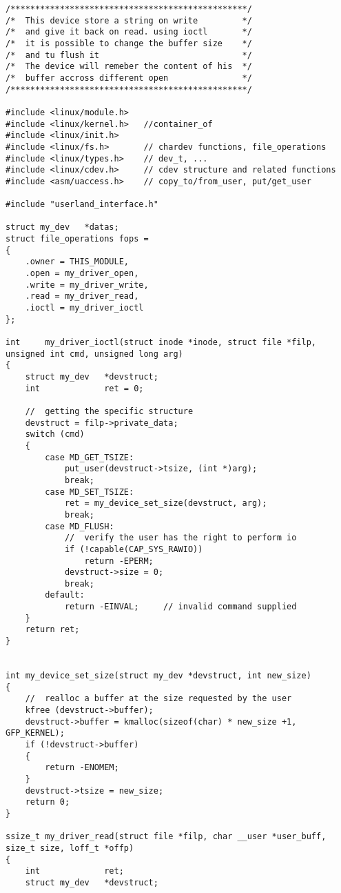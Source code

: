 \documentclass[11pt]{report}
\begin{document}
    \begin{lstlisting}
/************************************************/
/*  This device store a string on write         */
/*  and give it back on read. using ioctl       */
/*  it is possible to change the buffer size    */
/*  and tu flush it                             */
/*  The device will remeber the content of his  */
/*  buffer accross different open               */
/************************************************/

#include <linux/module.h>
#include <linux/kernel.h>   //container_of
#include <linux/init.h>
#include <linux/fs.h>       // chardev functions, file_operations
#include <linux/types.h>    // dev_t, ...
#include <linux/cdev.h>     // cdev structure and related functions
#include <asm/uaccess.h>    // copy_to/from_user, put/get_user

#include "userland_interface.h"

struct my_dev   *datas;
struct file_operations fops = 
{
    .owner = THIS_MODULE,
    .open = my_driver_open,
    .write = my_driver_write,
    .read = my_driver_read,
    .ioctl = my_driver_ioctl
};

int     my_driver_ioctl(struct inode *inode, struct file *filp, unsigned int cmd, unsigned long arg)
{
    struct my_dev   *devstruct;
    int             ret = 0;
    
    //  getting the specific structure
    devstruct = filp->private_data;
    switch (cmd)
    {
        case MD_GET_TSIZE:
            put_user(devstruct->tsize, (int *)arg);
            break;
        case MD_SET_TSIZE:
            ret = my_device_set_size(devstruct, arg);
            break;
        case MD_FLUSH:
            //  verify the user has the right to perform io
            if (!capable(CAP_SYS_RAWIO))
                return -EPERM;
            devstruct->size = 0;
            break;
        default:
            return -EINVAL;     // invalid command supplied
    }
    return ret;
}


int my_device_set_size(struct my_dev *devstruct, int new_size)
{
    //  realloc a buffer at the size requested by the user
    kfree (devstruct->buffer);
    devstruct->buffer = kmalloc(sizeof(char) * new_size +1, GFP_KERNEL);
    if (!devstruct->buffer)
    {
        return -ENOMEM;
    }
    devstruct->tsize = new_size;
    return 0;
}

ssize_t my_driver_read(struct file *filp, char __user *user_buff, size_t size, loff_t *offp)
{
    int             ret;
    struct my_dev   *devstruct;
    

\end{lstlisting}
\end{document}
